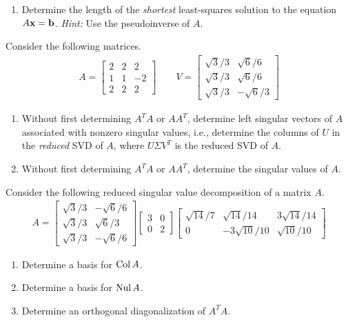 \begin{tasks}[resume, style=enumerate]
\begin{enumerate}[label=(\alph*)]
    $\rank(A) = 2$.
  \item
    Determine the length of the \textit{shortest} least-squares
    solution to the equation $A\mathbf x = \mathbf b$.  \textit{Hint:} Use the
    pseudoinverse of $A$.
  \end{enumerate}
\task
  \label{prob:svd-prev}
  Consider the following matrices.
  \begin{align*}
    A =
    \begin{bmatrix}
      2 & 2 & 2 \\
      1 & 1 & -2 \\
      2 & 2 & 2
    \end{bmatrix}
    \qquad
    V =
    \begin{bmatrix}
      \sqrt{3} / 3 & \sqrt{6} / {6} \\
      \sqrt{3} / 3 & \sqrt{6} / {6} \\
      \sqrt{3} / 3 & -\sqrt{6} / {3}
    \end{bmatrix}
  \end{align*}
  \begin{enumerate}[label=(\alph*)]
  \item
    Without first determining $A^TA$ or $AA^T$, determine left singular vectors
    of $A$ associated with nonzero singular values, i.e., determine the
    columns of $U$ in the \textit{reduced} SVD of $A$, where $U\Sigma
    V^T$ is the reduced SVD of $A$.
  \item
    Without first determining $A^TA$ or $AA^T$, determine the singular
    values of $A$.
  \end{enumerate}
\task
  Consider the following reduced singular value decomposition of a
  matrix $A$.
  \begin{align*}
    A
    =
    \begin{bmatrix}
      \sqrt{3} / 3 & -\sqrt{6} / 6 \\
      \sqrt{3} / 3 & \sqrt{6} / 3 \\
      \sqrt{3} / 3 & -\sqrt{6} / 6
    \end{bmatrix}
    \begin{bmatrix}
      3 & 0 \\
      0 & 2
    \end{bmatrix}
    \begin{bmatrix}
      \sqrt{14} / 7 & \sqrt{14} / 14 & 3 \sqrt{14} / 14 \\
      0 & -3 \sqrt{10} / 10 & \sqrt{10} / 10
    \end{bmatrix}
  \end{align*}
  \begin{enumerate}[label=(\alph*)]
  \item
    Determine a basis for $\operatorname{\mathrm{Col}} A$.
  \item
    Determine a basis for $\operatorname{\mathrm{Nul}} A$.
  \item
    Determine an orthogonal diagonalization of $A^T A$.
  \end{enumerate}
\end{tasks}

